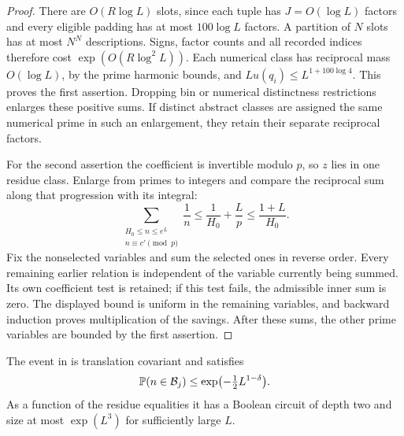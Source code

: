 \begin{proof}
There are $O(R\log L)$ slots, since each tuple has $J=O(\log L)$
factors and every eligible padding has at most $100\log L$ factors.
A partition of $N$ slots has at most $N^N$ descriptions.  Signs,
factor counts and all recorded indices therefore cost
$\exp(O(R\log^2L))$.  Each numerical class has reciprocal mass
$O(\log L)$, by the prime harmonic bounds, and
$Lu(q_i)\le L^{1+100\log4}$.  This proves the first assertion.
Dropping bin or numerical distinctness restrictions enlarges these
positive sums.  If distinct abstract classes are assigned the same
numerical prime in such an enlargement, they retain their separate
reciprocal factors.

For the second assertion the coefficient is invertible modulo $p$,
so $z$ lies in one residue class.  Enlarge from primes to integers and
compare the reciprocal sum along that progression with its integral:
\[
 \sum_{\substack{H_0\le n\le e^L\\n\equiv c'\!\!\pmod p}}\frac1n
 \le\frac1{H_0}+\frac Lp\le\frac{1+L}{H_0}.
\]
Fix the nonselected variables and sum the selected ones in reverse
order.  Every remaining earlier relation is independent of the
variable currently being summed.  Its own coefficient test is retained;
if this test fails, the admissible inner sum is zero.  The displayed
bound is uniform in the remaining variables, and backward induction
proves multiplication of the savings.  After these sums, the other
prime variables are bounded by the first assertion.
\end{proof}

\begin{lemma}\label{q:bad}
The event in  is translation covariant and satisfies
\[
 \mathbb P(n\in\mathcal B_j)
 \le\exp\bigl(-\tfrac12L^{1-\delta}\bigr).
\]
As a function of the residue equalities it has a Boolean circuit of
depth two and size at most $\exp(L^3)$ for sufficiently large $L$.
\end{lemma}

